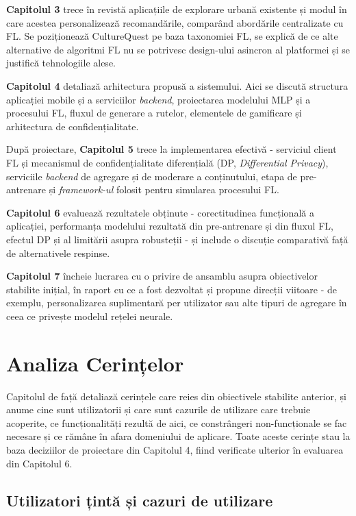 \documentclass[12pt,a4paper]{report}
\begin{document}
\textbf{Capitolul 3} trece în revistă aplicațiile de explorare urbană existente și modul în care acestea personalizează recomandările, comparând abordările centralizate cu FL. Se poziționează CultureQuest pe baza taxonomiei FL, se explică de ce alte alternative de algoritmi FL nu se potrivesc design-ului asincron al platformei și se justifică tehnologiile alese.

\textbf{Capitolul 4} detaliază arhitectura propusă a sistemului. Aici se discută structura aplicației mobile și a serviciilor \textit{backend}, proiectarea modelului MLP și a procesului FL, fluxul de generare a rutelor, elementele de gamificare și arhitectura de confidențialitate.

După proiectare, \textbf{Capitolul 5} trece la implementarea efectivă - serviciul client FL și mecanismul de confidențialitate diferențială (DP, \textit{Differential Privacy}), serviciile \textit{backend} de agregare și de moderare a conținutului, etapa de pre-antrenare și \textit{framework-ul} folosit pentru simularea procesului FL.

\textbf{Capitolul 6} evaluează rezultatele obținute - corectitudinea funcțională a aplicației, performanța modelului rezultată din pre-antrenare și din fluxul FL, efectul DP și al limitării asupra robusteții - și include o discuție comparativă față de alternativele respinse.

\textbf{Capitolul 7} încheie lucrarea cu o privire de ansamblu asupra obiectivelor stabilite inițial, în raport cu ce a fost dezvoltat și propune direcții viitoare - de exemplu, personalizarea suplimentară per utilizator sau alte tipuri de agregare în ceea ce privește modelul rețelei neurale.

\chapter{Analiza Cerințelor}

Capitolul de față detaliază cerințele care reies din obiectivele stabilite anterior, și anume cine sunt utilizatorii și care sunt cazurile de utilizare care trebuie acoperite, ce funcționalități rezultă de aici, ce constrângeri non-funcționale se fac necesare și ce rămâne în afara domeniului de aplicare. Toate aceste cerințe stau la baza deciziilor de proiectare din Capitolul 4, fiind verificate ulterior în evaluarea din Capitolul 6.

\section{Utilizatori țintă și cazuri de utilizare}
\end{document}
